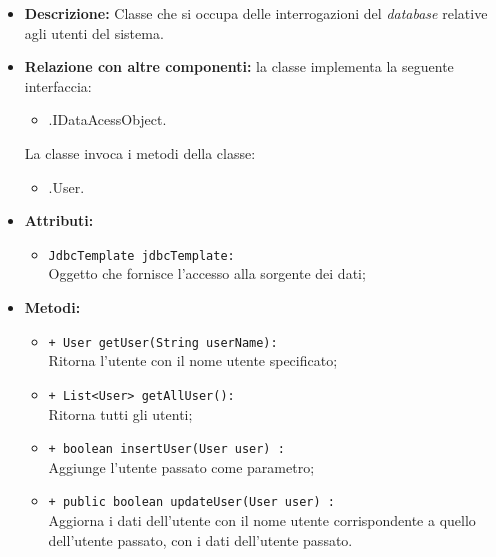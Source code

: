 \begin{flushleft}
\begin{itemize}
\item \textbf{Descrizione:} Classe che si occupa delle interrogazioni del \textit{database} relative agli utenti del sistema.
\item \textbf{Relazione con altre componenti:} la classe implementa la seguente interfaccia:
		\begin{itemize}
			\item \smodel{}.IDataAcessObject.
		\end{itemize}
		La classe invoca i metodi della classe:
		\begin{itemize}
			\item \smodel{}.User.
		\end{itemize}
\item \textbf{Attributi:}
\begin{sloppypar}
\begin{itemize}
\item \texttt{JdbcTemplate jdbcTemplate:}\\ Oggetto che fornisce l'accesso alla sorgente dei dati;
\end{itemize}
\end{sloppypar}
\item \textbf{Metodi:}
\begin{sloppypar}
\begin{itemize}
\item \texttt{+ User getUser(String userName):}\\ Ritorna l’utente con il nome utente specificato; 
\item \texttt{+ List<User> getAllUser():}\\ Ritorna tutti gli utenti;
\item \texttt{+ boolean insertUser(User user) :}\\ Aggiunge l'utente passato come parametro;
\item \texttt{+ public boolean updateUser(User user) :}\\ Aggiorna i dati dell'utente con il nome utente corrispondente a quello dell'utente passato, con i dati dell'utente passato.
\end{itemize}
\end{sloppypar}
\end{itemize}
\end{flushleft}

